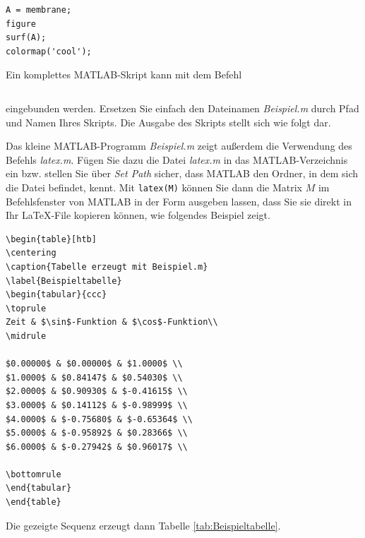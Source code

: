 \begin{lstlisting}[style=matlab]
% Matlab-Logo
A = membrane; 
figure 
surf(A); 
colormap('cool');
\end{lstlisting}

Ein komplettes MATLAB-Skript kann mit dem Befehl
\begin{verbatim}

\end{verbatim}
eingebunden werden. Ersetzen Sie einfach den Dateinamen \textit{Beispiel.m} durch Pfad und Namen Ihres Skripts. Die Ausgabe des Skripts stellt sich wie folgt dar.


Das kleine MATLAB-Programm \textit{Beispiel.m} zeigt außerdem die Verwendung des Befehls \textit{latex.m}. Fügen Sie dazu die Datei \textit{latex.m} in das MATLAB-Verzeichnis ein bzw. stellen Sie über \textit{Set Path} sicher, dass MATLAB den Ordner, in dem sich die Datei befindet, kennt. Mit \verb|latex(M)| können Sie dann die Matrix $M$ im Befehlsfenster von MATLAB in der Form ausgeben lassen, dass Sie sie direkt in Ihr \LaTeX-File kopieren können, wie folgendes Beispiel zeigt.
\begin{verbatim}
\begin{table}[htb]
\centering
\caption{Tabelle erzeugt mit Beispiel.m}
\label{Beispieltabelle}
\begin{tabular}{ccc}
\toprule
Zeit & $\sin$-Funktion & $\cos$-Funktion\\
\midrule

$0.00000$ & $0.00000$ & $1.0000$ \\
$1.0000$ & $0.84147$ & $0.54030$ \\
$2.0000$ & $0.90930$ & $-0.41615$ \\
$3.0000$ & $0.14112$ & $-0.98999$ \\
$4.0000$ & $-0.75680$ & $-0.65364$ \\
$5.0000$ & $-0.95892$ & $0.28366$ \\
$6.0000$ & $-0.27942$ & $0.96017$ \\

\bottomrule
\end{tabular}
\end{table}
\end{verbatim}
Die gezeigte Sequenz erzeugt dann Tabelle \ref{tab:Beispieltabelle}.
